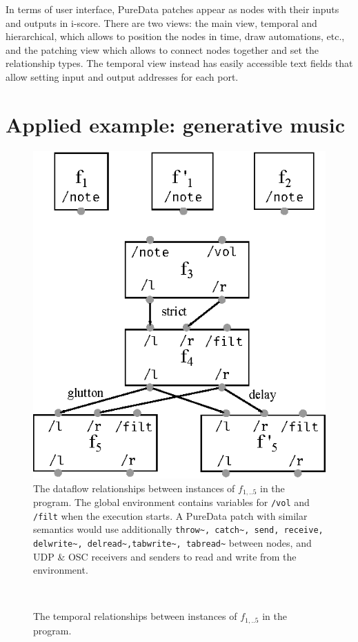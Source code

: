 \documentclass{article}
\begin{document}
In terms of user interface, PureData patches appear as nodes with their inputs and outputs in i-score.
There are two views: the main view, temporal and hierarchical, which allows to position the nodes in time, draw automations, etc., and the patching view which allows to connect nodes together and set the relationship types.
The temporal view instead has easily accessible text fields that allow setting input and output addresses for each port.

\section{Applied example: generative music}
\begin{figure}
    \centering
    \includegraphics[scale=0.7]{images/nodes.eps}
    
    \caption{The dataflow relationships between instances of $f_{1,..5}$ in the program. The global environment contains variables for \lstinline|/vol| and \lstinline|/filt| when the execution starts. A PureData patch with similar semantics would use additionally \lstinline|throw~, catch~, send, receive, delwrite~, delread~,tabwrite~, tabread~| between nodes, and UDP \& OSC receivers and senders to read and write from the environment.}
    \label{fig.datapatch}
\end{figure}~
\begin{figure}
    \centering
    \begin{tikzpicture}
    
    \end{tikzpicture}
    \caption{The temporal relationships between instances of $f_{1,..5}$ in the program.}
    \label{fig.timepatch}
\end{figure}
\end{document}
